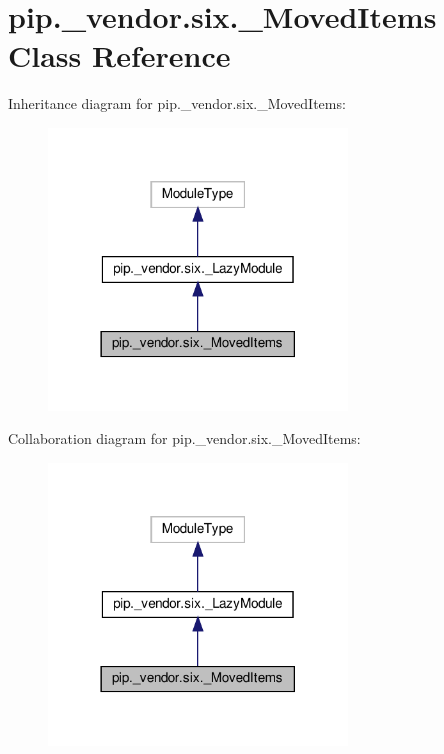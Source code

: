 \hypertarget{classpip_1_1__vendor_1_1six_1_1__MovedItems}{}\section{pip.\+\_\+vendor.\+six.\+\_\+\+Moved\+Items Class Reference}
\label{classpip_1_1__vendor_1_1six_1_1__MovedItems}


Inheritance diagram for pip.\+\_\+vendor.\+six.\+\_\+\+Moved\+Items\+:
\nopagebreak
\begin{figure}[H]
\begin{center}
\leavevmode
\includegraphics[width=225pt]{classpip_1_1__vendor_1_1six_1_1__MovedItems__inherit__graph}
\end{center}
\end{figure}


Collaboration diagram for pip.\+\_\+vendor.\+six.\+\_\+\+Moved\+Items\+:
\nopagebreak
\begin{figure}[H]
\begin{center}
\leavevmode
\includegraphics[width=225pt]{classpip_1_1__vendor_1_1six_1_1__MovedItems__coll__graph}
\end{center}
\end{figure}
